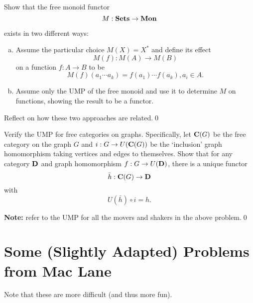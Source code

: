 \begin{problem}
  Show that the free monoid functor
  \begin{equation*}
    M : \mathbf{{Sets}} \to \mathbf{{Mon}}
  \end{equation*}

  exists in two different ways:
  \begin{enumerate}[(a)]
    \item Assume the particular choice \(M(X) = X^*\) and define its effect
      \[ M(f) : M(A) \to M(B)\]
      on a function \(f : A \to B\) to be
      \[M(f)(a_1 \cdots a_k) = f(a_1) \cdots f(a_k), a_i \in A.\]
    \item Assume only the UMP of the free monoid and use it to determine \(M\)
      on functions, showing the result to be a functor.
  \end{enumerate}

  Reflect on how these two approaches are related.\qed{}
\end{problem}

\begin{problem}
  Verify the UMP for free categories on graphs. Specifically, let \(\mathbf{{C}}(G)\) be
  the free category on the graph \(G\) and \(i : G \to U(\mathbf{{C}}(G))\) be the
  `inclusion' graph homomorphism taking vertices and edges to themselves. Show
  that for any category \(\mathbf{{D}}\) and graph homomorphism \(f : G \to U(\mathbf{{D}})\), there
  is a unique functor 
  \[\bar h : \mathbf{{C}}(G) \to \mathbf{{D}}\] 
  with 
  \[U(\bar h) \circ i = h.\]

\textbf{Note:} refer to the UMP for all the movers and shakers in the above
  problem.\qed{}
\end{problem}

\section*{Some (Slightly Adapted) Problems from Mac Lane}

Note that these are more difficult (and thus more fun).

